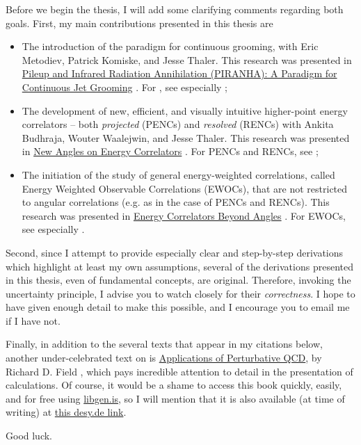 Before we begin the thesis, I will add some clarifying comments regarding both goals.
%
First, my main contributions presented in this thesis are
\begin{itemize}
    \item
        The introduction of the \PIRANHA{} paradigm for continuous grooming, with Eric Metodiev, Patrick Komiske, and Jesse Thaler.
        This research was presented in \ul{Pileup and Infrared Radiation Annihilation (PIRANHA): A Paradigm for Continuous Jet Grooming} \cite{Alipour-Fard:2023prj}.
        For \PIRANHA{}, see especially ;

    \item
        The development of new, efficient, and visually intuitive higher-point energy correlators -- both \emph{projected} (PENCs) and \emph{resolved} (RENCs) with Ankita Budhraja, Wouter Waalejwin, and Jesse Thaler.
        This research was presented in \ul{New Angles on Energy Correlators} \cite{Alipour-fard:2024szj}.
        For PENCs and RENCs, see ;

    \item
        The initiation of the study of general energy-weighted correlations, called Energy Weighted Observable Correlations (EWOCs), that are not restricted to angular correlations (e.g. as in the case of PENCs and RENCs).
        This research was presented in \ul{Energy Correlators Beyond Angles} \cite{Alipour-fard:2025dvp}.
        For EWOCs, see especially .
\end{itemize}

Second, since I attempt to provide especially clear and step-by-step derivations which highlight at least my own assumptions, several of the derivations presented in this thesis, even of fundamental concepts, are original.
%
Therefore, invoking the uncertainty principle, I advise you to watch closely for their \emph{correctness}.
%
I hope to have given enough detail to make this possible, and I encourage you to email me if I have not.

Finally, in addition to the several texts that appear in my citations below, another under-celebrated text on  is \underline{Applications of Perturbative QCD}, by Richard D. Field \cite{Field:1989uq}, which pays incredible attention to detail in the presentation of calculations.
%
Of course, it would be a shame to access this book quickly, easily, and for free using \url{libgen.is}, so I will mention that it is also available (at time of writing) at \href{https://www.desy.de/~jung/qcd_and_mc_2009-2010/R.Field-Applications-of-pQCD.pdf}{this desy.de link}.

\begin{center}
Good luck.
\end{center}
